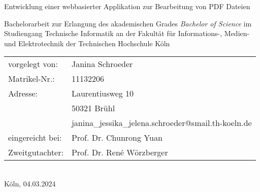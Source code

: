 \begin{titlepage}
%
%
\begin{center}
\end{center}
%
\vfill
%
\begin{huge}
Entwicklung einer webbasierter Applikation zur Bearbeitung von PDF Dateien\\[10mm]
\end{huge}
%
Bachelorarbeit zur Erlangung des akademischen Grades\newline
\emph{Bachelor of Science}\newline
im Studiengang Technische Informatik\newline
an der Fakultät für Informations-, Medien- und Elektrotechnik\newline
der Technischen Hochschule Köln
%
\vfill
%
\begin{tabular}{@{}ll}
vorgelegt von: & Janina Schroeder\\
Matrikel-Nr.:  & 11132206\\
Adresse:       & Laurentiusweg 10\\
                & 50321 Brühl\\
                & janina\_jessika\_jelena.schroeder@smail.th-koeln.de\\[5mm]
eingereicht bei:   & Prof. Dr. Chunrong Yuan\\
Zweitgutachter: & Prof. Dr. René Wörzberger
\end{tabular}	
%
\\[10mm]
%
Köln, 04.03.2024%
%
\rmfamily%
%
\end{titlepage}